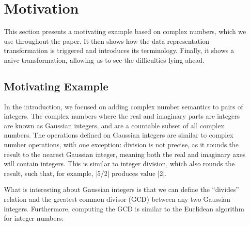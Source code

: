 \section{Motivation}
\label{sec:problem}

This section presents a motivating example based on complex numbers, which we use throughout the paper. It then shows how the data representation transformation is triggered and introduces its terminology. Finally, it shows a naive transformation, allowing us to see the difficulties lying ahead.

\subsection{Motivating Example}

In the introduction, we focused on adding complex number semantics to pairs of integers. The complex numbers where the real and imaginary parts are integers are known as Gaussian integers, and are a countable subset of all complex numbers. The operations defined on Gaussian integers are similar to complex number operations, with one exception: division is not precise, as it rounds the result to the nearest Gaussian integer, meaning both the real and imaginary axes will contain integers. This is similar to integer division, which also rounds the result, such that, for example, |5/2| produces value |2|.


What is interesting about Gaussian integers is that we can define the ``divides'' relation and the greatest common divisor (GCD) between any two Gaussian integers. Furthermore, computing the GCD is similar to the Euclidean algorithm for integer numbers:

